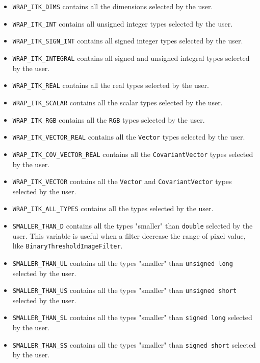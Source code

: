 \documentclass{InsightArticle}
\begin{document}
\begin{itemize}
  \item \verb$WRAP_ITK_DIMS$ contains all the dimensions selected by the user.

  \item \verb$WRAP_ITK_INT$ contains all unsigned integer types selected by the user.

  \item \verb$WRAP_ITK_SIGN_INT$ contains all signed integer types selected by the user.

  \item \verb$WRAP_ITK_INTEGRAL$ contains all signed and unsigned integral types
selected by the user.

  \item \verb$WRAP_ITK_REAL$ contains all the real types selected by the user.

  \item \verb$WRAP_ITK_SCALAR$ contains all the scalar types selected by the user.

  \item \verb$WRAP_ITK_RGB$ contains all the \verb$RGB$ types selected by the user.

  \item \verb$WRAP_ITK_VECTOR_REAL$ contains all the \verb$Vector$ types selected
by the user.

  \item \verb$WRAP_ITK_COV_VECTOR_REAL$ contains all the \verb$CovariantVector$ types selected
by the user.

  \item \verb$WRAP_ITK_VECTOR$ contains all the \verb$Vector$ and 
\verb$CovariantVector$ types selected by the user.

  \item \verb$WRAP_ITK_ALL_TYPES$ contains all the types selected by the user.

  \item \verb$SMALLER_THAN_D$ contains all the types "smaller" than \verb$double$
selected by the user. This variable is useful when a filter decrease the range
of pixel value, like \verb$BinaryThresholdImageFilter$.

  \item \verb$SMALLER_THAN_UL$ contains all the types "smaller" than \verb$unsigned long$
selected by the user.

  \item \verb$SMALLER_THAN_US$ contains all the types "smaller" than \verb$unsigned short$
selected by the user.

  \item \verb$SMALLER_THAN_SL$ contains all the types "smaller" than \verb$signed long$
selected by the user.

  \item \verb$SMALLER_THAN_SS$ contains all the types "smaller" than \verb$signed short$
selected by the user.

\end{itemize}
\end{document}
